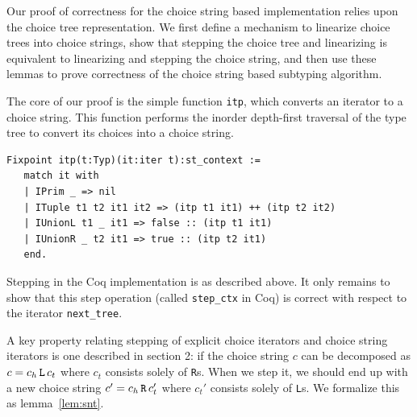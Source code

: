 \documentclass[a4paper,english]{lipics-v2019}
\renewcommand{\L}{{\tt L}\xspace}
\newcommand{\Ls}{{\tt L}s\xspace}
\newcommand{\R}{{\tt R}\xspace}
\newcommand{\Rs}{{\tt R}s\xspace}
\begin{document}
Our proof of correctness for the choice string based implementation relies 
upon the choice tree representation. We first define a mechanism to linearize
choice trees into choice strings, show that stepping the choice tree and linearizing
is equivalent to linearizing and stepping the choice string, and then use these lemmas
to prove correctness of the choice string based subtyping algorithm.

The core of our proof is the simple function \verb|itp|, which converts an iterator
to a choice string. This function performs the inorder depth-first traversal of the
type tree to convert its choices into a choice string. 

\begin{small}\begin{verbatim}
Fixpoint itp(t:Typ)(it:iter t):st_context :=
   match it with
   | IPrim _ => nil
   | ITuple t1 t2 it1 it2 => (itp t1 it1) ++ (itp t2 it2)
   | IUnionL t1 _ it1 => false :: (itp t1 it1)
   | IUnionR _ t2 it1 => true :: (itp t2 it1)
   end.
\end{verbatim}\end{small}

Stepping in the Coq implementation is as described above. It only remains to
show that this step operation (called \verb|step_ctx| in Coq) is correct with
respect to the iterator \verb|next_tree|.

A key property relating stepping of explicit choice iterators and choice
string iterators is one described in section 2: if the choice string $c$  can
be decomposed as $c=c_h\,\L\,c_t$ where $c_t$ consists solely of \Rs. When we
step it, we should end up with a new choice string $c'=c_h\,\R\,c_t'$ where
$c_t'$ consists solely of \Ls. We formalize this as lemma~\ref{lem:snt}.
\end{document}

